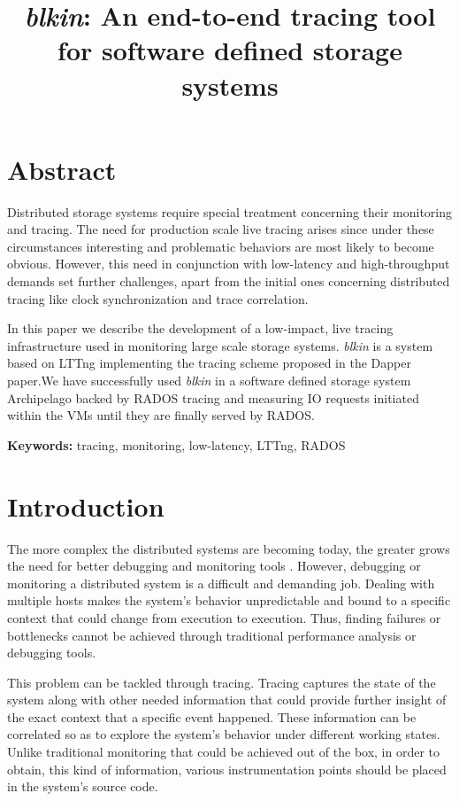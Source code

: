 \documentclass[a4paper,10pt,twocolumn]{article}
\begin{document}
\title{\emph{blkin}: An end-to-end tracing tool for software defined storage 
systems}
\date{}
\maketitle

\section*{Abstract}
Distributed storage systems require special treatment concerning their
monitoring and tracing. The need for production scale live tracing arises since
under these circumstances interesting and problematic behaviors are most likely
to become obvious. However, this need in conjunction with low-latency and
high-throughput demands set further challenges, apart from the initial ones
concerning distributed tracing like clock synchronization and trace correlation.

In this paper we describe the development of a low-impact, live tracing
infrastructure used in monitoring large scale storage systems. \emph{blkin} is a
system based on LTTng\cite{lttng} implementing the tracing scheme proposed in
the Dapper paper\cite{dapper}.We have successfully used \emph{blkin} in a
software defined storage system Archipelago\cite{archip} backed by
RADOS\cite{rados} tracing and measuring IO requests initiated within the VMs
until they are finally served by RADOS.


\textbf{Keywords: } tracing, monitoring, low-latency, LTTng, RADOS

\section{Introduction}

The more complex the distributed systems are becoming today, the greater grows
the need for better debugging and monitoring tools . However, debugging or
monitoring a distributed system is a difficult and demanding job. Dealing with
multiple hosts makes the system's behavior unpredictable and bound to a
specific context that could change from execution to execution. Thus, finding
failures or bottlenecks cannot be achieved through traditional performance
analysis or debugging tools. 

This problem can be tackled through tracing. Tracing captures the state of the
system along with other needed information that could provide further insight of
the exact context that a specific event happened. These information can be
correlated so as to explore the system's behavior under different working
states. Unlike traditional monitoring that could be achieved out of the box, in
order to obtain, this kind of information, various instrumentation points should
be placed in the system's source code.
\end{document}
